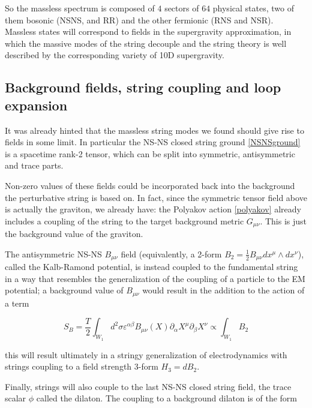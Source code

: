 So the massless spectrum is composed of $4$ sectors of $64$ physical states, two of them bosonic (NSNS, and RR) and the other fermionic (RNS and NSR). Massless states will correspond to fields in the supergravity approximation, in which the massive modes of the string decouple and the string theory is well described by the corresponding variety of 10D supergravity.\\



\subsection{Background fields, string coupling and loop expansion}

It was already hinted that the massless string modes we found should give rise to fields in some limit. In particular the NS-NS closed string ground \eqref{NSNSground} is a spacetime rank-2 tensor, which can be split into symmetric, antisymmetric and trace parts.

Non-zero values of these fields could be incorporated back into the background the perturbative string is based on. In fact, since the symmetric tensor field above is actually the graviton, we already have: the Polyakov action \eqref{polyakov} already includes a coupling of the string to the target background metric $G_{\mu\nu}$. This is just the background value of the graviton.

The antisymmetric NS-NS $B_{\mu\nu}$ field (equivalently, a 2-form $B_2 = \frac{1}{2} B_{\mu\nu} dx^\mu \wedge dx^\nu$), called the Kalb-Ramond potential, is instead coupled to the fundamental string in a way that resembles the generalization of the coupling of a particle to the EM potential; a background value of $B_{\mu\nu}$ would result in the addition to the action of a term

\begin{equation}
	S_B = \frac{T}{2} \int_{W_1} d^2 \sigma \varepsilon^{\alpha\beta} B_{\mu\nu}(X) \partial_\alpha X^\mu \partial_\beta X^\nu \propto \int_{W_1} B_2
	\label{}
\end{equation}

this will result ultimately in a stringy generalization of electrodynamics with strings coupling to a field strength 3-form $H_3 = dB_2$.

Finally, strings will also couple to the last NS-NS closed string field, the trace scalar $\phi$ called the dilaton. The coupling to a background dilaton is of the form

